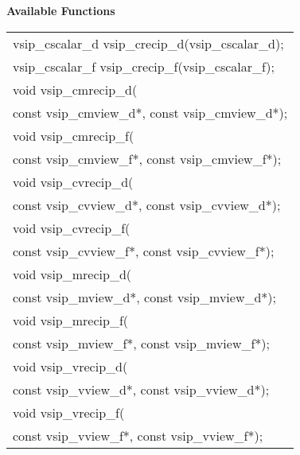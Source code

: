 \\\cvsiplh
\\ \hspace*{.8cm} \vspace*{.1cm} \textbf{Available Functions }
\\ \hspace*{1.1cm} {
\ttfamily
\begin{tabular}[H]{l}
vsip\_cscalar\_d vsip\_crecip\_d(vsip\_cscalar\_d);\\
vsip\_cscalar\_f vsip\_crecip\_f(vsip\_cscalar\_f);\\
void vsip\_cmrecip\_d(\\*\hspace{.6cm}const vsip\_cmview\_d*, const vsip\_cmview\_d*);\\
void vsip\_cmrecip\_f(\\*\hspace{.6cm}const vsip\_cmview\_f*, const vsip\_cmview\_f*);\\
void vsip\_cvrecip\_d(\\*\hspace{.6cm}const vsip\_cvview\_d*, const vsip\_cvview\_d*);\\
void vsip\_cvrecip\_f(\\*\hspace{.6cm}const vsip\_cvview\_f*, const vsip\_cvview\_f*);\\
void vsip\_mrecip\_d(\\*\hspace{.6cm}const vsip\_mview\_d*, const vsip\_mview\_d*);\\
void vsip\_mrecip\_f(\\*\hspace{.6cm}const vsip\_mview\_f*, const vsip\_mview\_f*);\\
void vsip\_vrecip\_d(\\*\hspace{.6cm}const vsip\_vview\_d*, const vsip\_vview\_d*);\\
void vsip\_vrecip\_f(\\*\hspace{.6cm}const vsip\_vview\_f*, const vsip\_vview\_f*);\\
\end{tabular}
}
\\\pyjvsiph
